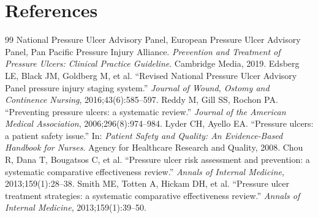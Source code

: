 \section*{References}
\begin{thebibliography}{99}
 National Pressure Ulcer Advisory Panel, European Pressure Ulcer Advisory Panel, Pan Pacific Pressure Injury Alliance. \textit{Prevention and Treatment of Pressure Ulcers: Clinical Practice Guideline}. Cambridge Media, 2019.
 Edsberg LE, Black JM, Goldberg M, et al. ``Revised National Pressure Ulcer Advisory Panel pressure injury staging system.'' \textit{Journal of Wound, Ostomy and Continence Nursing}, 2016;43(6):585--597.
 Reddy M, Gill SS, Rochon PA. ``Preventing pressure ulcers: a systematic review.'' \textit{Journal of the American Medical Association}, 2006;296(8):974--984.
 Lyder CH, Ayello EA. ``Pressure ulcers: a patient safety issue.'' In: \textit{Patient Safety and Quality: An Evidence-Based Handbook for Nurses}. Agency for Healthcare Research and Quality, 2008.
 Chou R, Dana T, Bougatsos C, et al. ``Pressure ulcer risk assessment and prevention: a systematic comparative effectiveness review.'' \textit{Annals of Internal Medicine}, 2013;159(1):28--38.
 Smith ME, Totten A, Hickam DH, et al. ``Pressure ulcer treatment strategies: a systematic comparative effectiveness review.'' \textit{Annals of Internal Medicine}, 2013;159(1):39--50.

\end{thebibliography}
